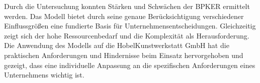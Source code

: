



Durch die Untersuchung konnten Stärken und Schwächen der BPKER ermittelt werden. Das Modell bietet durch seine genaue Berücksichtigung verschiedener Einflussgrö{\ss}en eine fundierte Basis für Unternehmensentscheidungen. Gleichzeitig zeigt sich der hohe Ressourcenbedarf und die Komplexität als Herausforderung. Die Anwendung des Modells auf die HobelKunstwerkstatt GmbH hat die praktischen Anforderungen und Hindernisse beim Einsatz hervorgehoben und gezeigt, dass eine individuelle Anpassung an die spezifischen Anforderungen eines Unternehmens wichtig ist.

